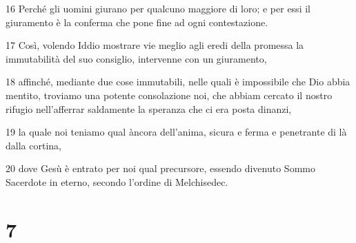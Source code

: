 \par 16 Perché gli uomini giurano per qualcuno maggiore di loro; e per essi il giuramento è la conferma che pone fine ad ogni contestazione.
\par 17 Così, volendo Iddio mostrare vie meglio agli eredi della promessa la immutabilità del suo consiglio, intervenne con un giuramento,
\par 18 affinché, mediante due cose immutabili, nelle quali è impossibile che Dio abbia mentito, troviamo una potente consolazione noi, che abbiam cercato il nostro rifugio nell'afferrar saldamente la speranza che ci era posta dinanzi,
\par 19 la quale noi teniamo qual àncora dell'anima, sicura e ferma e penetrante di là dalla cortina,
\par 20 dove Gesù è entrato per noi qual precursore, essendo divenuto Sommo Sacerdote in eterno, secondo l'ordine di Melchisedec.

\chapter{7}

